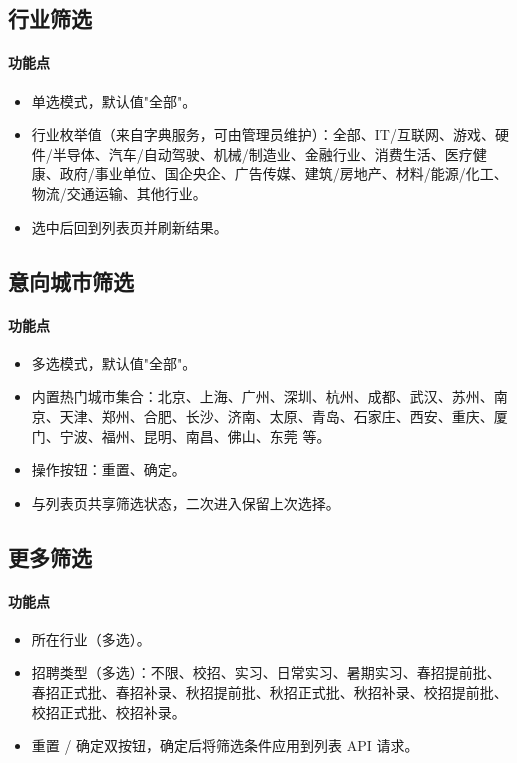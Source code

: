\documentclass[12pt,a4paper]{ctexart}
\begin{document}
\subsection{行业筛选}
\paragraph{功能点}
\begin{itemize}[leftmargin=2em]
    \item 单选模式，默认值"全部"。
    \item 行业枚举值（来自字典服务，可由管理员维护）：全部、IT/互联网、游戏、硬件/半导体、汽车/自动驾驶、机械/制造业、金融行业、消费生活、医疗健康、政府/事业单位、国企央企、广告传媒、建筑/房地产、材料/能源/化工、物流/交通运输、其他行业。
    \item 选中后回到列表页并刷新结果。
\end{itemize}

\subsection{意向城市筛选}
\paragraph{功能点}
\begin{itemize}[leftmargin=2em]
    \item 多选模式，默认值"全部"。
    \item 内置热门城市集合：北京、上海、广州、深圳、杭州、成都、武汉、苏州、南京、天津、郑州、合肥、长沙、济南、太原、青岛、石家庄、西安、重庆、厦门、宁波、福州、昆明、南昌、佛山、东莞 等。
    \item 操作按钮：重置、确定。
    \item 与列表页共享筛选状态，二次进入保留上次选择。
\end{itemize}

\subsection{更多筛选}
\paragraph{功能点}
\begin{itemize}[leftmargin=2em]
    \item 所在行业（多选）。
    \item 招聘类型（多选）：不限、校招、实习、日常实习、暑期实习、春招提前批、春招正式批、春招补录、秋招提前批、秋招正式批、秋招补录、校招提前批、校招正式批、校招补录。
    \item 重置 / 确定双按钮，确定后将筛选条件应用到列表 API 请求。
\end{itemize}
\end{document}
